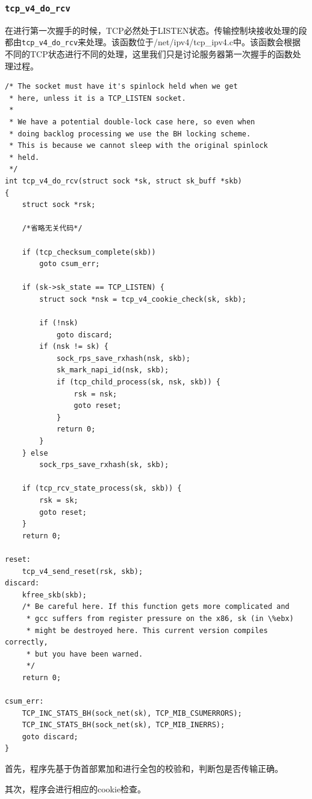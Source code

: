             \subsubsection{\texttt{tcp_v4_do_rcv}}
                在进行第一次握手的时候，TCP必然处于LISTEN状态。传输控制块接收处理的段都由\texttt{tcp_v4_do_rcv}来处理。该函数位于/net/ipv4/tcp\_ipv4.c中。该函数会根据不同的TCP状态进行不同的处理，这里我们只是讨论服务器第一次握手的函数处理过程。
\begin{verbatim}
/* The socket must have it's spinlock held when we get
 * here, unless it is a TCP_LISTEN socket.
 *
 * We have a potential double-lock case here, so even when
 * doing backlog processing we use the BH locking scheme.
 * This is because we cannot sleep with the original spinlock
 * held.
 */
int tcp_v4_do_rcv(struct sock *sk, struct sk_buff *skb)
{
    struct sock *rsk;

    /*省略无关代码*/

    if (tcp_checksum_complete(skb))
        goto csum_err;

    if (sk->sk_state == TCP_LISTEN) {
        struct sock *nsk = tcp_v4_cookie_check(sk, skb);

        if (!nsk)
            goto discard;
        if (nsk != sk) {
            sock_rps_save_rxhash(nsk, skb);
            sk_mark_napi_id(nsk, skb);
            if (tcp_child_process(sk, nsk, skb)) {
                rsk = nsk;
                goto reset;
            }
            return 0;
        }
    } else
        sock_rps_save_rxhash(sk, skb);

    if (tcp_rcv_state_process(sk, skb)) {
        rsk = sk;
        goto reset;
    }
    return 0;

reset:
    tcp_v4_send_reset(rsk, skb);
discard:
    kfree_skb(skb);
    /* Be careful here. If this function gets more complicated and
     * gcc suffers from register pressure on the x86, sk (in \%ebx)
     * might be destroyed here. This current version compiles correctly,
     * but you have been warned.
     */
    return 0;

csum_err:
    TCP_INC_STATS_BH(sock_net(sk), TCP_MIB_CSUMERRORS);
    TCP_INC_STATS_BH(sock_net(sk), TCP_MIB_INERRS);
    goto discard;
}
\end{verbatim}

                首先，程序先基于伪首部累加和进行全包的校验和，判断包是否传输正确。

                其次，程序会进行相应的cookie检查。

